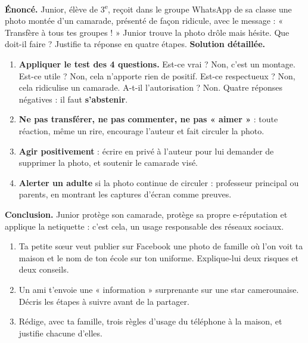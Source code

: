 \documentclass[11pt]{article}
\begin{document}
\begin{exoresolu}
\textbf{Énoncé.} Junior, élève de 3\textsuperscript{e}, reçoit dans le groupe WhatsApp de sa classe une photo montée d'un camarade, présenté de façon ridicule, avec le message : « Transfère à tous tes groupes ! » Junior trouve la photo drôle mais hésite. Que doit-il faire ? Justifie ta réponse en quatre étapes.
\tcblower
\textbf{Solution détaillée.}
\begin{enumerate}
\item \textbf{Appliquer le test des 4 questions.} Est-ce vrai ? Non, c'est un montage. Est-ce utile ? Non, cela n'apporte rien de positif. Est-ce respectueux ? Non, cela ridiculise un camarade. A-t-il l'autorisation ? Non. Quatre réponses négatives : il faut \textbf{s'abstenir}.
\item \textbf{Ne pas transférer, ne pas commenter, ne pas « aimer »} : toute réaction, même un rire, encourage l'auteur et fait circuler la photo.
\item \textbf{Agir positivement} : écrire en privé à l'auteur pour lui demander de supprimer la photo, et soutenir le camarade visé.
\item \textbf{Alerter un adulte} si la photo continue de circuler : professeur principal ou parents, en montrant les captures d'écran comme preuves.
\end{enumerate}
\textbf{Conclusion.} Junior protège son camarade, protège sa propre e-réputation et applique la netiquette : c'est cela, un usage responsable des réseaux sociaux.
\end{exoresolu}

\begin{exercice}
\begin{enumerate}
\item Ta petite sœur veut publier sur Facebook une photo de famille où l'on voit ta maison et le nom de ton école sur ton uniforme. Explique-lui deux risques et deux conseils.
\item Un ami t'envoie une « information » surprenante sur une star camerounaise. Décris les étapes à suivre avant de la partager.
\item Rédige, avec ta famille, trois règles d'usage du téléphone à la maison, et justifie chacune d'elles.
\end{enumerate}
\end{exercice}
\end{document}
